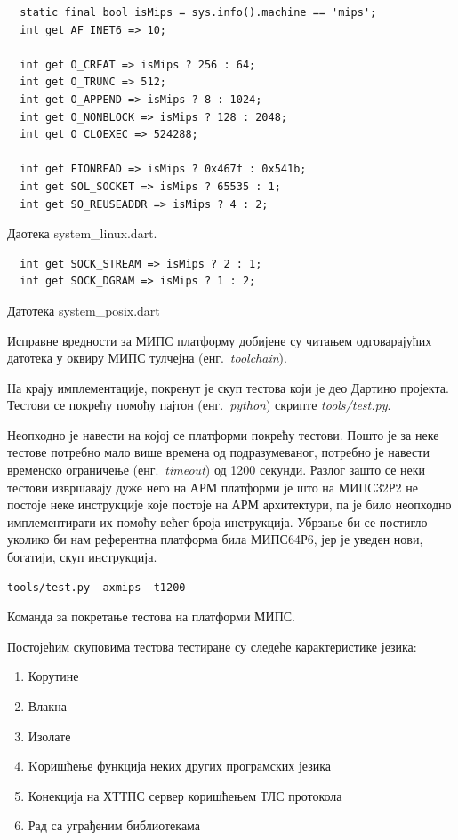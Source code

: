 \documentclass[12pt,oneside]{memoir}
\begin{document}
\begin{verbatim}
  static final bool isMips = sys.info().machine == 'mips';
  int get AF_INET6 => 10;

  int get O_CREAT => isMips ? 256 : 64;
  int get O_TRUNC => 512;
  int get O_APPEND => isMips ? 8 : 1024;
  int get O_NONBLOCK => isMips ? 128 : 2048;
  int get O_CLOEXEC => 524288;

  int get FIONREAD => isMips ? 0x467f : 0x541b;
  int get SOL_SOCKET => isMips ? 65535 : 1;
  int get SO_REUSEADDR => isMips ? 4 : 2;
\end{verbatim}

  Даотека system\_linux.dart.\\
  
\begin{verbatim}
  int get SOCK_STREAM => isMips ? 2 : 1;
  int get SOCK_DGRAM => isMips ? 1 : 2;
\end{verbatim}

  Датотека system\_posix.dart
 
Исправне вредности за МИПС платформу добијене су читањем одговарајућих датотека у оквиру МИПС тулчејна (енг.~\textit{toolchain}). 

На крају имплементације, покренут је скуп тестова који је део Дартино пројекта. Тестови се покрећу помоћу пајтон (енг.~\textit{python}) скрипте \textit{tools/test.py}.

Неопходно је навести на којој се платформи покрећу тестови. Пошто је за неке тестове потребно мало више времена од подразумеваног, потребно је навести временско ограничење (енг.~\textit{timeout}) од 1200 секунди. Разлог зашто се неки тестови извршавају дуже него на АРМ платформи је што на МИПС32Р2 не постоје неке инструкције које постоје на АРМ архитектури, па је било неопходно имплементирати их помоћу већег броја инструкција. Убрзање би се постигло уколико би нам референтна платформа била МИПС64Р6, јер је уведен нови, богатији, скуп инструкција.\\

\begin{verbatim}
tools/test.py -axmips -t1200
\end{verbatim}
Команда за покретање тестова на платформи МИПС.

Постојећим скуповима тестова тестиране су следеће карактеристике језика:
\begin{enumerate}
\item Корутине
\item Влакна
\item Изолате
\item Kоришћење функција неких других програмских језика
\item Конекција на ХТТПС сервер коришћењем ТЛС протокола
\item Рад са уграђеним библиотекама
\end{enumerate}
\end{document}
